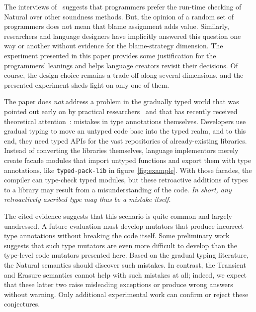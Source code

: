
The interviews of~\citet{tgpk-dls-2018} suggests that programmers
prefer the run-time checking of Natural over other soundness methods. But,
the opinion of a random set of programmers does not mean that blame
assignment adds value. Similarly, researchers and language designers have
implicitly answered this question one way or another without evidence for the
blame-strategy dimension. The experiment presented in this paper provides some
justification for the programmers' leanings and helps language creators revisit
their decisions. Of course, the design choice remains a trade-off
along several dimensions, and  the presented experiment sheds light on
only one of them. 

The paper does {\em not\/} address a problem in the gradually typed world that
was pointed out early on by practical researchers~\citep{incorrect-ts,
sta-nt-base-types, wmwz-ecoop-2017} and that has recently received theoretical
attention~\citep{gfd-oopsla-2019, cc-oopsla-20}: mistakes in type annotations
themselves.  Developers use gradual typing to move an untyped code base into the
typed realm, and to this end, they need typed APIs for the vast repositories of
already-existing libraries. Instead of converting the libraries themselves,
language implementors merely create facade modules that import untyped functions
and export them with type annotations, like {\tt typed-pack-lib} in
figure~\ref{fig:example}.  With those facades, the compiler can 
type-check typed modules, but these retroactive additions of types to a library
may result from a misunderstanding of the code. \emph{In short, any retroactively ascribed
type may thus be a mistake itself.}

The cited evidence suggests that this scenario is quite common and largely
unadressed.  A future evaluation must develop mutators that produce incorrect
type annotations without breaking the code itself. Some preliminary work
suggests that such type mutators are even more difficult to develop than the
type-level code mutators presented here. Based on the gradual typing literature,
the Natural semantics should discover such mistakes. In contrast, the Transient
and Erasure semantics cannot help with such mistakes at all; indeed, we expect
that these latter two raise misleading exceptions or produce wrong answers
without warning.  Only additional experimental work can confirm or reject these
conjectures.




